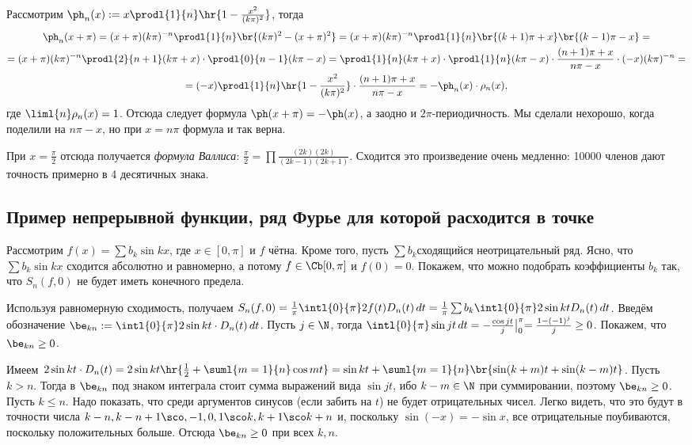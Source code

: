 \documentclass[a4paper]{article}
\newcommand{\intlop}{\intl{0}{\pi}}
\newcommand{\frpi}{\frac{1}{\pi}}
\newcommand{\sbs}[2]{\bigl|_{{#1}}^{{#2}}}
\begin{document}
\begin{ex}
Рассмотрим $\ph_n(x) := x\prodl{1}{n} \hr{1 - \frac{x^2}{(k\pi)^2}}$, тогда
\begin{multline*}
\ph_n(x+\pi)=(x+\pi)(k\pi)^{-n}\prodl{1}{n}\br{(k\pi)^2-(x+\pi)^2}=
(x+\pi)(k\pi)^{-n}\prodl{1}{n}\br{(k+1)\pi+x}\br{(k-1)\pi-x} =\\
=(x+\pi)(k\pi)^{-n}\prodl{2}{n+1}(k\pi+x)\cdot \prodl{0}{n-1}(k\pi-x)=
\prodl{1}{n}(k\pi+x)\cdot\prodl{1}{n}(k\pi-x) \cdot\frac{(n+1)\pi + x}{n\pi -x}\cdot(-x)(k\pi)^{-n} =\\
=(-x)\prodl{1}{n}\hr{1-\frac{x^2}{(k\pi)^2}} \cdot \frac{(n+1)\pi + x}{n\pi -x} =
-\ph_n(x)\cdot\rho_n(x),
\end{multline*}
 где $\liml{n}\rho_n(x)=1$. Отсюда следует формула $\ph(x+\pi) = -\ph(x)$, а заодно
и $2\pi$-периодичность. Мы сделали нехорошо, когда поделили на $n\pi -x$, но при $x=n\pi$ формула и так верна.

При $x = \frac{\pi}{2}$ отсюда получается \emph{формула Валлиса}: $\frac{\pi}{2} = \prod \frac{(2k)(2k)}{(2k-1)(2k+1)}$. Сходится это произведение очень медленно:
10000 членов дают точность примерно в 4 десятичных знака.
\end{ex}

\subsection{Пример непрерывной функции, ряд Фурье для которой расходится в точке}

Рассмотрим $f(x) = \sum b_k \sin kx$, где $x\in [0,\pi]$ и $f$ чётна. Кроме того, пусть $\sum b_k$\т сходящийся неотрицательный ряд. Ясно,
что $\sum b_k \sin kx$ сходится абсолютно и равномерно, а потому $f \in\Cb[0,\pi]$ и $f(0)=0$. Покажем, что можно подобрать коэффициенты $b_k$
так, что $S_n(f,0)$ не будет иметь конечного предела.

Используя равномерную сходимость, получаем $S_n(f,0) = \frpi \intlop 2f(t)D_n(t)\,d t = \frpi \sum
b_k\intlop 2\sin kt D_n(t) \,d t$. Введём обозначение $\be_{kn} := \intlop 2\sin kt \cdot
D_n(t)\,d t$. Пусть $j \in \N$, тогда $\intlop \sin jt \,d t = -\frac{\cos jt}{j}\sbs{0}{\pi} =
\frac{1 - (-1)^j}{j} \ge 0$. Покажем, что $\be_{kn} \ge 0$.

Имеем $2\sin kt \cdot D_n(t) = 2\sin kt\hr{\frac{1}{2}+\suml{m=1}{n}\cos mt} = \sin kt + \suml{m=1}{n}\br{\sin(k+m)t + \sin(k-m)t}$.
Пусть $k>n$. Тогда в $\be_{kn}$ под знаком интеграла стоит сумма выражений вида $\sin jt$, ибо $k - m \in \N$ при суммировании, поэтому $\be_{kn} \ge 0$.
Пусть $k \le n$. Надо показать, что среди аргументов синусов (если забить на $t$) не будет отрицательных чисел. Легко видеть, что это будут в точности
числа $k-n,k-n+1\sco,-1,0,1\sco k,k+1\sco k+n$ и, поскольку $\sin(-x) = -\sin x$, все отрицательные поубиваются, поскольку положительных больше.
Отсюда $\be_{kn} \ge 0$ при всех $k,n$.
\end{document}
